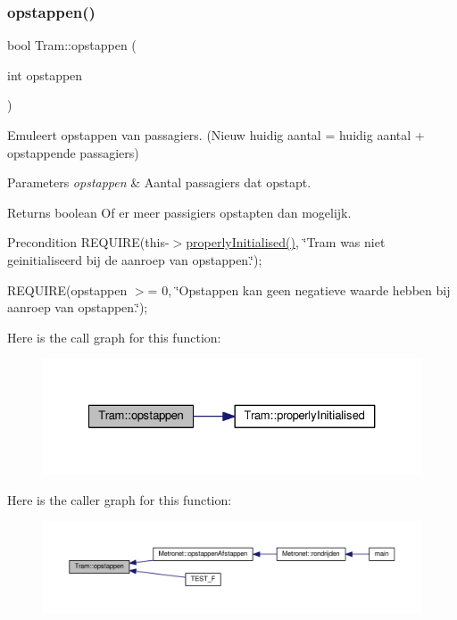 \subsubsection{\texorpdfstring{opstappen()}{opstappen()}}
{\footnotesize\ttfamily bool Tram\+::opstappen (\begin{DoxyParamCaption}\item[{int}]{opstappen }\end{DoxyParamCaption})}



Emuleert opstappen van passagiers. (Nieuw huidig aantal = huidig aantal + opstappende passagiers) 


\begin{DoxyParams}{Parameters}
{\em opstappen} & Aantal passagiers dat opstapt. \\
\hline
\end{DoxyParams}
\begin{DoxyReturn}{Returns}
boolean Of er meer passigiers opstapten dan mogelijk. 
\end{DoxyReturn}
\begin{DoxyPrecond}{Precondition}
R\+E\+Q\+U\+I\+RE(this-\/$>$\hyperlink{class_tram_ac2688f590e4db232b4f535c9bf959efb}{properly\+Initialised()}, \char`\"{}\+Tram was niet geinitialiseerd bij de aanroep van opstappen.\char`\"{}); 

R\+E\+Q\+U\+I\+RE(opstappen $>$= 0, \char`\"{}\+Opstappen kan geen negatieve waarde hebben bij aanroep van opstappen.\char`\"{}); 
\end{DoxyPrecond}
Here is the call graph for this function\+:\nopagebreak
\begin{figure}[H]
\begin{center}
\leavevmode
\includegraphics[width=327pt]{class_tram_aaeb00c535a6854f85dcc42cdff97ad0c_cgraph}
\end{center}
\end{figure}
Here is the caller graph for this function\+:\nopagebreak
\begin{figure}[H]
\begin{center}
\leavevmode
\includegraphics[width=350pt]{class_tram_aaeb00c535a6854f85dcc42cdff97ad0c_icgraph}
\end{center}
\end{figure}
\mbox{\label{class_tram_ac2688f590e4db232b4f535c9bf959efb}} 
